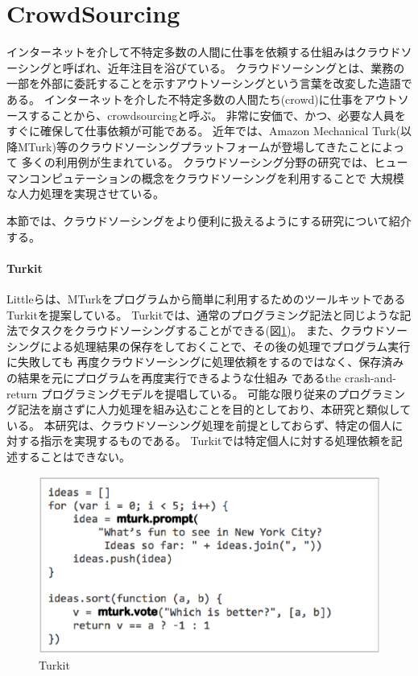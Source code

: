 \section{CrowdSourcing}\label{crowdsourcing}

インターネットを介して不特定多数の人間に仕事を依頼する仕組みはクラウドソーシングと呼ばれ、近年注目を浴びている。
クラウドソーシングとは、業務の一部を外部に委託することを示すアウトソーシングという言葉を改変した造語である\cite{riseofcrowdsourcing}。
インターネットを介した不特定多数の人間たち(crowd)に仕事をアウトソースすることから、crowdsourcingと呼ぶ。
非常に安価で、かつ、必要な人員をすぐに確保して仕事依頼が可能である。
近年では、Amazon Mechanical
Turk\cite{amt}(以降MTurk)等のクラウドソーシングプラットフォームが登場してきたことによって
多くの利用例が生まれている。
クラウドソーシング分野の研究では、ヒューマンコンピュテーションの概念をクラウドソーシングを利用することで
大規模な人力処理を実現させている。

本節では、クラウドソーシングをより便利に扱えるようにする研究について紹介する。

\paragraph{Turkit}\label{turkit}

\mbox{}

Littleらは、MTurkをプログラムから簡単に利用するためのツールキットであるTurkit\cite{turkit}を提案している。
Turkitでは、通常のプログラミング記法と同じような記法でタスクをクラウドソーシングすることができる(図\ref{fig:turkit})。
また、クラウドソーシングによる処理結果の保存をしておくことで、その後の処理でプログラム実行に失敗しても
再度クラウドソーシングに処理依頼をするのではなく、保存済みの結果を元にプログラムを再度実行できるような仕組み
であるthe crash-and-return プログラミングモデルを提唱している。
可能な限り従来のプログラミング記法を崩さずに人力処理を組み込むことを目的としており、本研究と類似している。
本研究は、クラウドソーシング処理を前提としておらず、特定の個人に対する指示を実現するものである。
Turkitでは特定個人に対する処理依頼を記述することはできない。

\begin{figure}[htbp]
  \begin{center}
  \includegraphics[width=.6\linewidth]{images/turkit.eps}
  \end{center}
  \caption{Turkit}
  \label{fig:turkit}
\end{figure}

